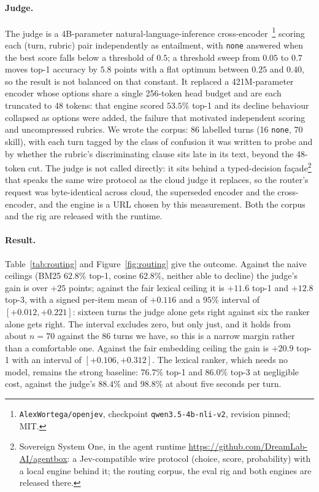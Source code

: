 \paragraph{Judge.} The judge is a 4B-parameter natural-language-inference cross-encoder~\cite{openjev2026}\footnote{\texttt{AlexWortega/openjev}, checkpoint \texttt{qwen3.5-4b-nli-v2}, revision pinned; MIT.} scoring each (turn, rubric) pair independently as entailment, with \texttt{none} answered when the best score falls below a threshold of $0.5$; a threshold sweep from $0.05$ to $0.7$ moves top-1 accuracy by $5.8$ points with a flat optimum between $0.25$ and $0.40$, so the result is not balanced on that constant. It replaced a 421M-parameter encoder whose options share a single 256-token head budget and are each truncated to 48 tokens: that engine scored $53.5\%$ top-1 and its decline behaviour collapsed as options were added, the failure that motivated independent scoring and uncompressed rubrics. We wrote the corpus: 86 labelled turns (16 \texttt{none}, 70 skill), with each turn tagged by the class of confusion it was written to probe and by whether the rubric's discriminating clause sits late in its text, beyond the 48-token cut. The judge is not called directly: it sits behind a typed-decision façade\footnote{Sovereign System One, in the agent runtime \url{https://github.com/DreamLab-AI/agentbox}: a Jev-compatible wire protocol (choice, score, probability) with a local engine behind it; the routing corpus, the eval rig and both engines are released there.} that speaks the same wire protocol as the cloud judge it replaces, so the router's request was byte-identical across cloud, the superseded encoder and the cross-encoder, and the engine is a URL chosen by this measurement. Both the corpus and the rig are released with the runtime.

\paragraph{Result.} Table~\ref{tab:routing} and Figure~\ref{fig:routing} give the outcome. Against the naive ceilings (BM25 $62.8\%$ top-1, cosine $62.8\%$, neither able to decline) the judge's gain is over $+25$ points; against the fair lexical ceiling it is $+11.6$ top-1 and $+12.8$ top-3, with a signed per-item mean of $+0.116$ and a $95\%$ interval of $[+0.012,+0.221]$: sixteen turns the judge alone gets right against six the ranker alone gets right. The interval excludes zero, but only just, and it holds from about $n=70$ against the 86 turns we have, so this is a narrow margin rather than a comfortable one. Against the fair embedding ceiling the gain is $+20.9$ top-1 with an interval of $[+0.106,+0.312]$. The lexical ranker, which needs no model, remains the strong baseline: $76.7\%$ top-1 and $86.0\%$ top-3 at negligible cost, against the judge's $88.4\%$ and $98.8\%$ at about five seconds per turn.

